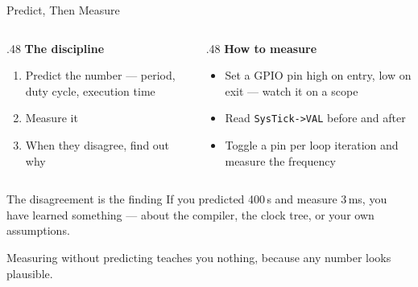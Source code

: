\documentclass[9pt,aspectratio=169,xcolor=table]{beamer}
\begin{document}
\begin{frame}{Predict, Then Measure}
    \begin{columns}[T]
    \begin{column}{.48\textwidth}
        \textbf{The discipline}
        \begin{enumerate}
            \item \alert{Predict} the number --- period, duty cycle, execution
                  time
            \item \alert{Measure} it
            \item When they disagree, \alert{find out why}
        \end{enumerate}
    \end{column}
    \begin{column}{.48\textwidth}
        \textbf{How to measure}
        {\small
        \begin{itemize}\itemsep1pt
            \item Set a GPIO pin high on entry, low on exit --- watch it on a
                  scope
            \item Read \texttt{SysTick->VAL} before and after
            \item Toggle a pin per loop iteration and measure the frequency
        \end{itemize}}
    \end{column}
    \end{columns}

    \vspace{3mm}
    \begin{block}{The disagreement is the finding}
        If you predicted 400\,\textmu s and measure 3\,ms, you have learned
        something --- about the compiler, the clock tree, or your own assumptions.

        \vspace{1mm}
        \alert{Measuring without predicting teaches you nothing}, because any
        number looks plausible.
    \end{block}
\end{frame}
\end{document}
